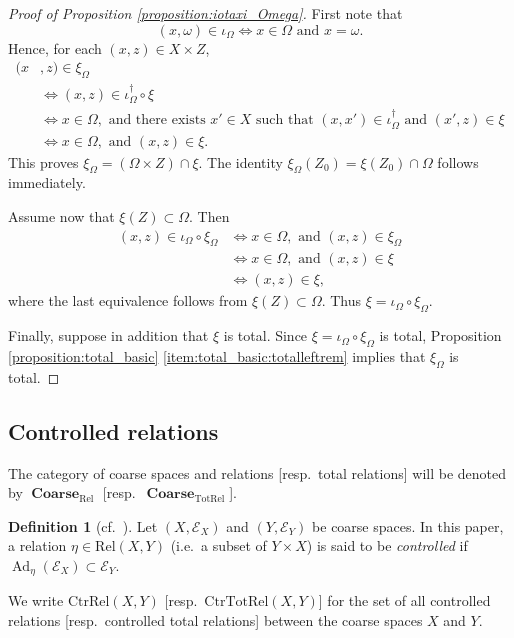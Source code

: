 \documentclass[12pt, a4paper]{amsart}
\theoremstyle{definition}
\newtheorem{definition}[theorem]{Definition}
\newcommand{\Ad}{\mathop{\mathrm{Ad}}\nolimits}
\newcommand{\Coarse}{\mathop{\mathbf{Coarse}}\nolimits}
\newcommand{\Rel}{\mathrm{Rel}}
\newcommand{\TotRel}{\mathrm{TotRel}}
\newcommand{\CtrTotRel}{\mathrm{CtrTotRel}}
\newcommand{\CtrRel}{\mathrm{CtrRel}}
\begin{document}
\begin{proof}[Proof of Proposition \ref{proposition:iotaxi_Omega}]
First note that
\[
(x,\omega)\in\iota_\Omega
\iff
x\in \Omega \text{ and } x=\omega.
\]
Hence, for each $(x,z)\in X\times Z$,
\begin{align*}
(x&,z)\in\xi_\Omega \\
&\iff
(x,z)\in\iota_\Omega^\dagger\circ\xi \\
&\iff
x\in \Omega,\text{ and there exists }x'\in X
\text{ such that }(x,x')\in\iota_\Omega^\dagger
\text{ and }(x',z)\in\xi \\
&\iff
x\in \Omega,\text{ and }(x,z)\in\xi.
\end{align*}
This proves $\xi_\Omega=(\Omega\times Z)\cap\xi$.
The identity $\xi_\Omega(Z_0)=\xi(Z_0)\cap\Omega$ follows immediately.

Assume now that $\xi(Z)\subset\Omega$.
Then
\begin{align*}
(x,z)\in\iota_\Omega\circ\xi_\Omega
&\iff
x\in\Omega,\text{ and }(x,z)\in\xi_\Omega \\
&\iff
x\in\Omega,\text{ and }(x,z)\in\xi \\
&\iff
(x,z)\in\xi,
\end{align*}
where the last equivalence follows from $\xi(Z)\subset\Omega$.
Thus $\xi=\iota_\Omega\circ\xi_\Omega$.

Finally, suppose in addition that $\xi$ is total.
Since $\xi=\iota_\Omega\circ\xi_\Omega$ is total, Proposition
\ref{proposition:total_basic} \eqref{item:total_basic:totalleftrem} implies that $\xi_\Omega$ is total.
\end{proof}


\subsection{Controlled relations}

The category of coarse spaces and relations [resp.~total relations] will be
denoted by $\Coarse_{\Rel}$ [resp.~$\Coarse_{\TotRel}$].

\begin{definition}[cf.~{\cite[Definition 3.17]{MartinezVigolo2026roe}}]\label{definition:controlledRel}
Let $(X,\mathcal{E}_X)$ and $(Y,\mathcal{E}_Y)$ be coarse spaces.
In this paper, a relation $\eta\in\Rel(X,Y)$
(i.e.~a subset of $Y\times X$) is said to be \emph{controlled} if
$\Ad_\eta(\mathcal{E}_X)\subset\mathcal{E}_Y$.
\end{definition}

We write $\CtrRel(X,Y)$ [resp.~$\CtrTotRel(X,Y)$] for the set of all
controlled relations [resp.~controlled total relations] between the coarse
spaces $X$ and $Y$.
\end{document}
